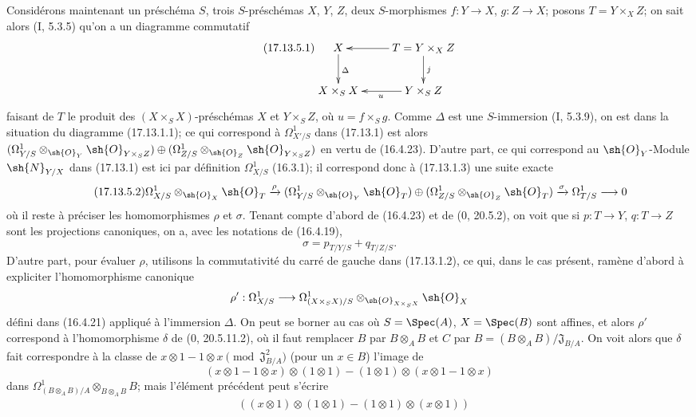 \begin{env}[17.13.5]
\label{IV.17.13.5}
Considérons maintenant un préschéma $S$, trois $S$-préschémas $X$, $Y$, $Z$, deux $S$-morphismes $f:Y\to X$, $g:Z\to X$; posons $T=Y\times_XZ$; on sait alors (I, 5.3.5) qu'on a un diagramme commutatif
\[
\label{IV.17.13.5.1}
\tag{17.13.5.1}
\xymatrix{
  X \ar[d]^{\Delta} & T=Y\times_X Z \ar[l] \ar[d]^{j}\\
  X\times_S X & Y\times_S Z \ar[l]^{u}
}
\]
faisant de $T$ le produit des $(X\times_SX)$-préschémas $X$ et $Y\times_SZ$, où $u=f\times_Sg$. Comme $\Delta$ est une $S$-immersion (I, 5.3.9), on est dans la situation du diagramme (17.13.1.1); ce qui correspond à $\Omega^1_{X'/S}$ dans (17.13.1) est alors $(\Omega^1_{Y/S}\otimes_{\sh{O}_Y}\sh{O}_{Y\times_SZ})\oplus(\Omega^1_{Z/S}\otimes_{\sh{O}_Z}\sh{O}_{Y\times_SZ})$ en vertu de (16.4.23). D'autre part, ce qui correspond au $\sh{O}_Y$-Module $\sh{N}_{Y/X}$ dans (17.13.1) est ici par définition $\Omega^1_{X/S}$ (16.3.1); il correspond donc à (17.13.1.3) une suite exacte
\[
\label{IV.17.13.5.2}
\tag{17.13.5.2}
\Omega^1_{X/S}\otimes_{\sh{O}_X}\sh{O}_T\xrightarrow{\rho}
(\Omega^1_{Y/S}\otimes_{\sh{O}_Y}\sh{O}_T)\oplus
(\Omega^1_{Z/S}\otimes_{\sh{O}_Z}\sh{O}_T)
\xrightarrow{\sigma}\Omega^1_{T/S}\to0
\]
où il reste à préciser les homomorphismes $\rho$ et $\sigma$. Tenant compte d'abord de (16.4.23) et de (0, 20.5.2), on voit que si $p:T\to Y$, $q:T\to Z$ sont les projections canoniques, on a, avec les notations de (16.4.19),
\[
\label{IV.17.13.5.3}
\tag{17.13.5.3}
\sigma=p_{T/Y/S}+q_{T/Z/S}.
\]
D'autre part, pour évaluer $\rho$, utilisons la commutativité du carré de gauche dans (17.13.1.2), ce qui, dans le cas présent, ramène d'abord à expliciter l'homomorphisme canonique
\[
\rho':\Omega^1_{X/S}\to\Omega^1_{(X\times_SX)/S}\otimes_{\sh{O}_{X\times_SX}}\sh{O}_X
\]
défini dans (16.4.21) appliqué à l'immersion $\Delta$. On peut se borner au cas où $S=\Spec(A)$, $X=\Spec(B)$ sont affines, et alors $\rho'$ correspond à l'homomorphisme $\delta$ de (0, 20.5.11.2), où il faut remplacer $B$ par $B\otimes_AB$ et $C$ par $B=(B\otimes_AB)/\mathfrak J_{B/A}$. On voit alors que $\delta$ fait correspondre à la classe de $x\otimes1-1\otimes x\pmod{\mathfrak J_{B/A}^2}$ (pour un $x\in B$) l'image de
\[
(x\otimes1-1\otimes x)\otimes(1\otimes1)-(1\otimes1)\otimes(x\otimes1-1\otimes x)
\]
dans $\Omega^1_{(B\otimes_AB)/A}\otimes_{B\otimes_AB}B$; mais l'élément précédent peut s'écrire
\[
\begin{split}
&((x\otimes1)\otimes(1\otimes1)-(1\otimes1)\otimes(x\otimes1))\\

\end{split}\]
\end{env}
